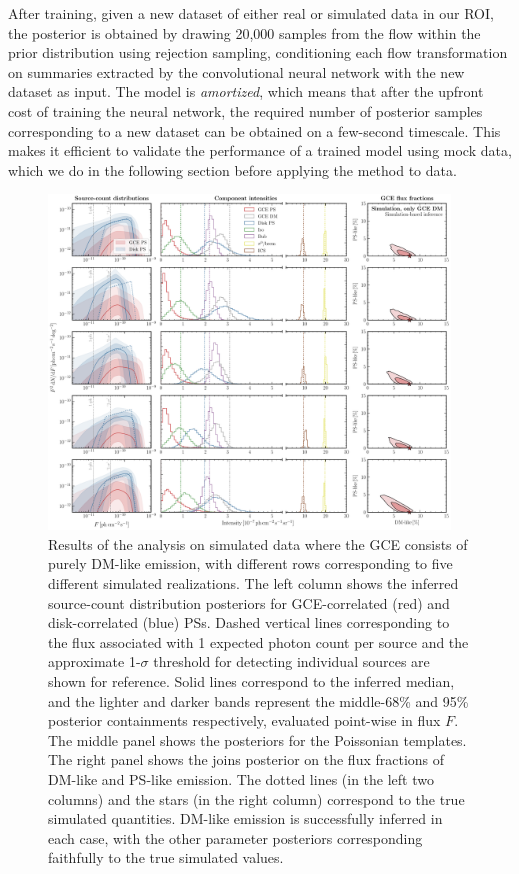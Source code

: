 \documentclass[prd,aps,10pt,nofootinbib,twocolumn,superscriptaddress,preprintnumbers,balancelastpage,longbibliography,floatfix]{revtex4-2}
\begin{document}
After training, given a new dataset of either real or simulated \Fermi data in our ROI, the posterior is obtained by drawing 20,000 samples from the flow within the prior distribution using rejection sampling, conditioning each flow transformation on summaries extracted by the convolutional neural network with the new dataset as input. The model is \emph{amortized}, which means that after the upfront cost of training the neural network, the required number of posterior samples corresponding to a new dataset can be obtained on a few-second timescale. This makes it efficient to validate the performance of a trained model using mock data, which we do in the following section before applying the method to \Fermi data.

%
\begin{figure}
\centering
\includegraphics[width=0.95\textwidth]{plots/sim_sbi_dm.pdf}
\caption{Results of the analysis on simulated \Fermi data where the GCE consists of purely DM-like emission, with different rows corresponding to five different simulated realizations. The left column shows the inferred source-count distribution posteriors for GCE-correlated (red) and disk-correlated (blue) PSs. Dashed vertical lines corresponding to the flux associated with 1 expected photon count per source and the approximate 1-$\sigma$ threshold for detecting individual sources are shown for reference. Solid lines correspond to the inferred median, and the lighter and darker bands represent the middle-68\% and 95\% posterior containments respectively, evaluated point-wise in flux $F$. The middle panel shows the posteriors for the Poissonian templates. The right panel shows the joins posterior on the flux fractions of DM-like and PS-like emission. The dotted lines (in the left two columns) and the stars (in the right column) correspond to the true simulated quantities. DM-like emission is successfully inferred in each case, with the other parameter posteriors corresponding faithfully to the true simulated values.} 
\label{fig:sim_sbi_dm}
\end{figure}
%
\end{document}
